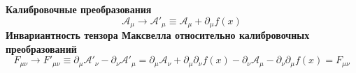\textbf{Калибровочные преобразования}\\
$$\mathcal A_\mu \longrightarrow \mathcal A'_\mu \equiv \mathcal A_\mu +\partial_\mu f(x)$$
\textbf{Инвариантность тензора Максвелла относительно калибровочных преобразований}\\
$$F_{\mu\nu} \longrightarrow F'_{\mu\nu} \equiv \partial_\mu \mathcal A'_\nu - \partial_\nu \mathcal A'_\mu = \partial_\mu \mathcal A_\nu + \partial_\mu \partial_\nu f(x) - \partial_\nu \mathcal A_\mu - \partial_\nu\partial_\mu f(x) = F_{\mu\nu}$$
 
